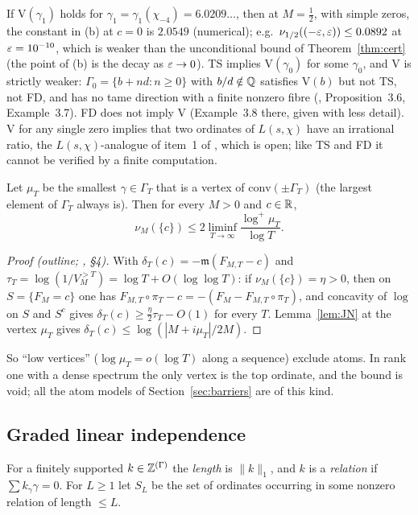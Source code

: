 If V$(\gamma_1)$ holds for $\gamma_1=\gamma_1(\chi_{-4})=6.0209\ldots$, then at $M=\frac12$, with simple zeros, the constant in (b) at $c=0$ is $2.0549$ (numerical); e.g.\ $\nu_{1/2}((-\varepsilon,\varepsilon))\le0.0892$ at $\varepsilon=10^{-10}$, which is weaker than the unconditional bound of Theorem~\ref{thm:cert} (the point of (b) is the decay as $\varepsilon\to0$). TS implies V$(\gamma_0)$ for some $\gamma_0$, and V is strictly weaker: $\Gamma_0=\{b+nd:n\ge0\}$ with $b/d\notin\mathbb Q$ satisfies V$(b)$ but not TS, not FD, and has no tame direction with a finite nonzero fibre (, Proposition~3.6, Example~3.7). FD does not imply V (Example~3.8 there, given with less detail). V for any single zero implies that two ordinates of $L(s,\chi)$ have an irrational ratio, the $L(s,\chi)$-analogue of item~1 of \cite{HKMN}, which is open; like TS and FD it cannot be verified by a finite computation.

\begin{theorem}\label{thm:LV}
Let $\mu_T$ be the smallest $\gamma\in\Gamma_T$ that is a vertex of $\mathrm{conv}(\pm\Gamma_T)$ (the largest element of $\Gamma_T$ always is). Then for every $M>0$ and $c\in\mathbb R$,
\[
\nu_M(\{c\})\le2\liminf_{T\to\infty}\frac{\log^+\mu_T}{\log T}.
\]
\end{theorem}

\begin{proof}[Proof (outline; , \S4)]
With $\delta_T(c)=-\mathfrak m(F_{M,T}-c)$ and $\tau_T=\log(1/V_M^{>T})=\log T+O(\log\log T)$: if $\nu_M(\{c\})=\eta>0$, then on $S=\{F_M=c\}$ one has $F_{M,T}\circ\pi_T-c=-(F_M-F_{M,T}\circ\pi_T)$, and concavity of $\log$ on $S$ and $S^c$ gives $\delta_T(c)\ge\frac\eta2\tau_T-O(1)$ for every $T$. Lemma~\ref{lem:JN} at the vertex $\mu_T$ gives $\delta_T(c)\le\log(|M+i\mu_T|/2M)$.
\end{proof}

So ``low vertices'' ($\log\mu_T=o(\log T)$ along a sequence) exclude atoms. In rank one with a dense spectrum the only vertex is the top ordinate, and the bound is void; all the atom models of Section~\ref{sec:barriers} are of this kind.

\subsection{Graded linear independence}\label{sec:GLI}
For a finitely supported $k\in\mathbb Z^{(\Gamma)}$ the \emph{length} is $\|k\|_1$, and $k$ is a \emph{relation} if $\sum k_\gamma\gamma=0$. For $L\ge1$ let $S_L$ be the set of ordinates occurring in some nonzero relation of length $\le L$.

